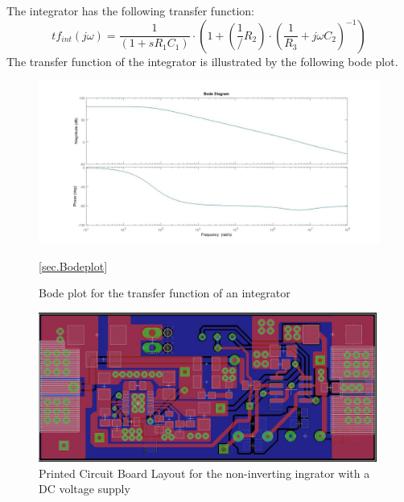 The integrator has the following transfer function: \\
\begin{equation}
	tf_{int}(j \omega)=\frac{1}{(1+s R_1 C_1)}\cdot(1+(\frac{1}/{R_2})\cdot(\frac{1}{R_3}+j \omega C_2)^{-1})
\end{equation}
The transfer function of the integrator is illustrated by the following bode plot. 

\begin{figure}

\includegraphics[width=\textwidth]{figures/Method/integrator/transferfunction_int.jpg}

\caption[Kurze Abbildungsbeschreibung]{Bode plot for the transfer function of an integrator } \ref{sec.Bodeplot}
\end{figure}

\begin{figure}
\includegraphics[width=0.99\textwidth]{figures/Method/integrator/PCB_Integrator.png}
    \caption{Printed Circuit Board Layout for the non-inverting ingrator with a DC voltage supply}
    
    \end{figure}	
    
    
    \newpage
    
